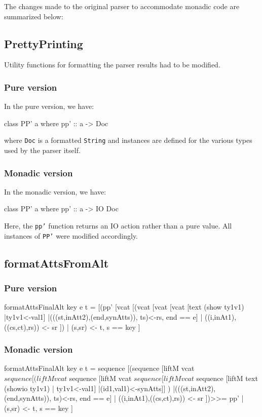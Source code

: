 \documentclass[../main.tex]{subfiles}
\begin{document}
The changes made to the original parser to accommodate monadic code are summarized below:

\subsection{PrettyPrinting}
Utility functions for formatting the parser results had to be modified.

\subsubsection{Pure version}
In the pure version, we have:

\begin{code}
class PP' a where
pp' :: a -> Doc
\end{code}

where \texttt{Doc} is a formatted \texttt{String} and instances are defined for the various types
used by the parser itself.

\subsubsection{Monadic version}

In the monadic version, we have:

\begin{code}
class PP' a where
pp' :: a -> IO Doc
\end{code}

Here, the \texttt{pp'} function returns an IO action rather than a pure value.
All instances of \texttt{PP'} were modified accordingly.

\subsection{formatAttsFromAlt}

\subsubsection{Pure version}
\begin{code}
formatAttsFinalAlt  key e t  =
[(pp' [vcat [(vcat [vcat [vcat [text (show ty1v1)  |ty1v1<-val1]
|(((st,inAtt2),(end,synAtts)), ts)<-rs, end == e]                             
| ((i,inAt1),((cs,ct),rs)) <- sr ])
| (s,sr) <- t, s == key ] 

\end{code}

\subsubsection{Monadic version}
\begin{code}
formatAttsFinalAlt  key e t  =
sequence [(sequence [liftM vcat $ sequence
[(liftM vcat $ sequence
[liftM vcat $ sequence
[liftM vcat $ sequence
[liftM text (showio ty1v1) | ty1v1<-val1]
|(id1,val1)<-synAtts]] )
|(((st,inAtt2),(end,synAtts)), ts)<-rs, end == e]
| ((i,inAt1),((cs,ct),rs)) <- sr ])>>= pp'
| (s,sr) <- t, s == key ]
\end{code}
\end{document}
